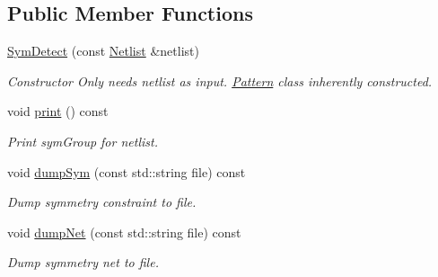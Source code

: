 \subsection*{Public Member Functions}
\begin{DoxyCompactItemize}
\item 
\hyperlink{classSymDetect_aaf0ca6563b2168db22cfd313ec773c23}{Sym\+Detect} (const \hyperlink{classNetlist}{Netlist} \&netlist)
\begin{DoxyCompactList}\small\item\em Constructor Only needs netlist as input. \hyperlink{classPattern}{Pattern} class inherently constructed. \end{DoxyCompactList}\item 
void \hyperlink{classSymDetect_a3e0354c4c11fe698377a4688c52fd533}{print} () const
\begin{DoxyCompactList}\small\item\em Print sym\+Group for netlist. \end{DoxyCompactList}\item 
void \hyperlink{classSymDetect_a12ab74214af31ed8fc5608e958e74786}{dump\+Sym} (const std\+::string file) const
\begin{DoxyCompactList}\small\item\em Dump symmetry constraint to file. \end{DoxyCompactList}\item 
void \hyperlink{classSymDetect_afe5e834e590ac2e055a17b6c951098d0}{dump\+Net} (const std\+::string file) const
\begin{DoxyCompactList}\small\item\em Dump symmetry net to file. \end{DoxyCompactList}\end{DoxyCompactItemize}
